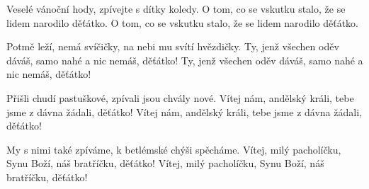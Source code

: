 \IncludeLilypond

Veselé vánoční hody, zpívejte s dítky koledy.
O tom, co se vskutku stalo, že se lidem narodilo děťátko.
O tom, co se vskutku stalo, že se lidem narodilo děťátko.

Potmě leží, nemá svíčičky, na nebi mu svítí hvězdičky.
Ty, jenž všechen oděv dáváš, samo nahé a nic nemáš, děťátko!
Ty, jenž všechen oděv dáváš, samo nahé a nic nemáš, děťátko!

Přišli chudí pastuškové, zpívali jsou chvály nové.
Vítej nám, andělský králi, tebe jsme z dávna žádali, děťátko!
Vítej nám, andělský králi, tebe jsme z dávna žádali, děťátko!

My s nimi také zpíváme, k betlémské chýši spěcháme.
Vítej, milý pacholíčku, Synu Boží, náš bratříčku, děťátko!
Vítej, milý pacholíčku, Synu Boží, náš bratříčku, děťátko!
